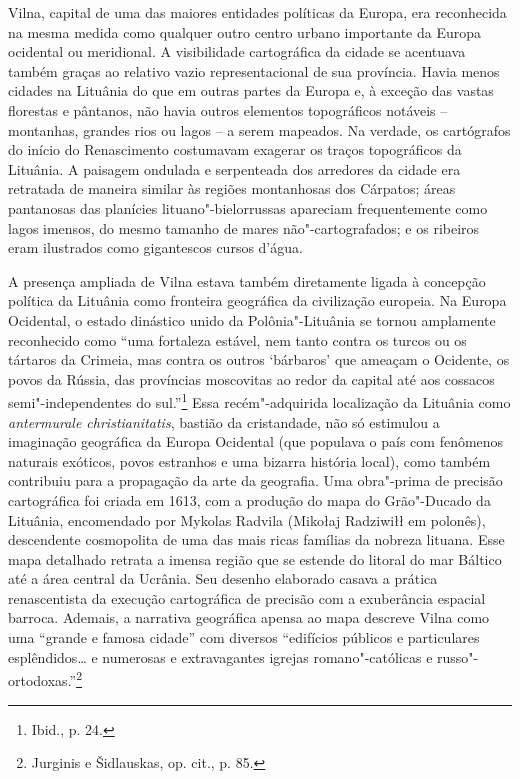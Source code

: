 Vilna, capital de uma das maiores entidades políticas da Europa, era
reconhecida na mesma medida como qualquer outro centro urbano importante
da Europa ocidental ou meridional. A visibilidade cartográfica da cidade
se acentuava também graças ao relativo vazio representacional de sua
província. Havia menos cidades na Lituânia do que em outras partes da
Europa e, à exceção das vastas florestas e pântanos, não havia outros
elementos topográficos notáveis -- montanhas, grandes rios ou lagos -- a
serem mapeados. Na verdade, os cartógrafos do início do Renascimento
costumavam exagerar os traços topográficos da Lituânia. A paisagem
ondulada e serpenteada dos arredores da cidade era retratada de maneira
similar às regiões montanhosas dos Cárpatos; áreas pantanosas das
planícies lituano"-bielorrussas apareciam frequentemente como lagos
imensos, do mesmo tamanho de mares não"-cartografados; e os ribeiros eram
ilustrados como gigantescos cursos d'água.

A presença ampliada de Vilna estava também diretamente ligada à
concepção política da Lituânia como fronteira geográfica da civilização
europeia. Na Europa Ocidental, o estado dinástico unido da
Polônia"-Lituânia se tornou amplamente reconhecido como ``uma fortaleza
estável, nem tanto contra os turcos ou os tártaros da Crimeia, mas
contra os outros `bárbaros' que ameaçam o Ocidente, os povos da Rússia,
das províncias moscovitas ao redor da capital até aos cossacos
semi"-independentes do sul.''\footnote{Ibid., p. 24.} Essa
recém"-adquirida localização da Lituânia como \textit{antermurale
christianitatis}, bastião da cristandade, não só estimulou a imaginação
geográfica da Europa Ocidental (que populava o país com fenômenos
naturais exóticos, povos estranhos e uma bizarra história local), como
também contribuiu para a propagação da arte da geografia. Uma obra"-prima
de precisão cartográfica foi criada em 1613, com a produção do mapa do
Grão"-Ducado da Lituânia, encomendado por Mykolas Radvila (Mikołaj
Radziwiłł em polonês), descendente cosmopolita de uma das mais ricas
famílias da nobreza lituana. Esse mapa detalhado retrata a imensa região
que se estende do litoral do mar Báltico até a área central da Ucrânia.
Seu desenho elaborado casava a prática renascentista da execução
cartográfica de precisão com a exuberância espacial barroca. Ademais, a
narrativa geográfica apensa ao mapa descreve Vilna como uma ``grande e
famosa cidade'' com diversos ``edifícios públicos e particulares
esplêndidos\ldots{} e numerosas e extravagantes igrejas romano"-católicas
e russo"-ortodoxas.''\footnote{Jurginis e Šidlauskas, op. cit., p. 85.}

